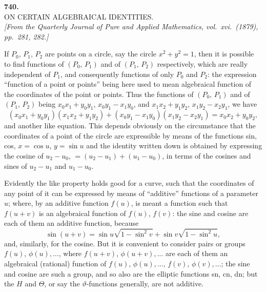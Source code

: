 \documentclass[11pt]{article}
\begin{document}
\bigskip

\begin{center}
\textbf{740.}\\[6pt]
\textsc{ON CERTAIN ALGEBRAICAL IDENTITIES.}\\[6pt]
\textit{[From the Quarterly Journal of Pure and Applied Mathematics, vol.\ xvi.\ (1879),\\
pp.\ 281, 282.]}
\end{center}

\bigskip

If $P_0$, $P_1$, $P_2$ are points on a circle, say the circle $x^2 + y^2 = 1$, then it is possible
to find functions of $(P_0,\, P_1)$ and of $(P_1,\, P_2)$ respectively, which are really independent
of $P_1$, and consequently functions of only $P_0$ and $P_2$: the expression ``function of
a point or points'' being here used to mean algebraical function of the coordinates of
the point or points. Thus the functions of $(P_0,\, P_1)$ and of $(P_1,\, P_2)$ being $x_0 x_1 + y_0 y_1$,
$x_0 y_1 - x_1 y_0$, and $x_1 x_2 + y_1 y_2$, $x_1 y_2 - x_2 y_1$, we have
\[
   (x_0 x_1 + y_0 y_1)(x_1 x_2 + y_1 y_2) + (x_0 y_1 - x_1 y_0)(x_1 y_2 - x_2 y_1) = x_0 x_2 + y_0 y_2,
\]
and another like equation. This depends obviously on the circumstance that the
coordinates of a point of the circle are expressible by means of the functions sin,
cos, $x = \cos u$, $y = \sin u$ and the identity written down is obtained by expressing the
cosine of $u_2 - u_0$, $= (u_2 - u_1) + (u_1 - u_0)$, in terms of the cosines and sines of $u_2 - u_1$
and $u_1 - u_0$.

Evidently the like property holds good for a curve, such that the coordinates of
any point of it can be expressed by means of ``additive'' functions of a parameter
$u$; where, by an additive function $f(u)$, is meant a function such that $f(u + v)$ is
an algebraical function of $f(u)$, $f(v)$: the sine and cosine are each of them an additive
function, because
\[
   \sin(u + v) = \sin u\sqrt{1 - \sin^2 v} + \sin v\sqrt{1 - \sin^2 u},
\]
and, similarly, for the cosine. But it is convenient to consider pairs or groups $f(u)$,
$\phi(u),\ldots$, where $f(u + v)$, $\phi(u + v),\ldots$ are each of them an algebraical (rational) function
of $f(u)$, $\phi(u),\ldots,\, f(v)$, $\phi(v),\ldots$; the sine and cosine are such a group, and so also are
the elliptic functions sn, cn, dn; but the $H$ and $\Theta$, or say the $\vartheta$-functions generally,
are not additive.
\end{document}
